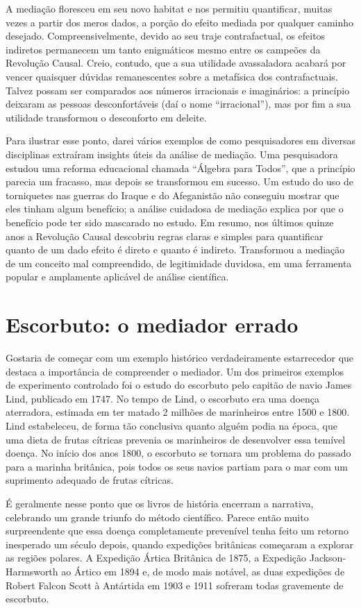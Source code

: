 \documentclass[11pt,a5paper,twoside]{book}
\begin{document}
A mediação floresceu em seu novo habitat e nos permitiu quantificar, muitas vezes a partir dos meros dados, a porção do efeito mediada por qualquer caminho desejado. Compreensivelmente, devido ao seu traje contrafactual, os efeitos indiretos permanecem um tanto enigmáticos mesmo entre os campeões da Revolução Causal. Creio, contudo, que a sua utilidade avassaladora acabará por vencer quaisquer dúvidas remanescentes sobre a metafísica dos contrafactuais. Talvez possam ser comparados aos números irracionais e imaginários: a princípio deixaram as pessoas desconfortáveis (daí o nome “irracional”), mas por fim a sua utilidade transformou o desconforto em deleite.

Para ilustrar esse ponto, darei vários exemplos de como pesquisadores em diversas disciplinas extraíram insights úteis da análise de mediação. Uma pesquisadora estudou uma reforma educacional chamada “Álgebra para Todos”, que a princípio parecia um fracasso, mas depois se transformou em sucesso. Um estudo do uso de torniquetes nas guerras do Iraque e do Afeganistão não conseguiu mostrar que eles tinham algum benefício; a análise cuidadosa de mediação explica por que o benefício pode ter sido mascarado no estudo. Em resumo, nos últimos quinze anos a Revolução Causal descobriu regras claras e simples para quantificar quanto de um dado efeito é direto e quanto é indireto. Transformou a mediação de um conceito mal compreendido, de legitimidade duvidosa, em uma ferramenta popular e amplamente aplicável de análise científica.

\section{Escorbuto: o mediador errado}
Gostaria de começar com um exemplo histórico verdadeiramente estarrecedor que destaca a importância de compreender o mediador. Um dos primeiros exemplos de experimento controlado foi o estudo do escorbuto pelo capitão de navio James Lind, publicado em 1747. No tempo de Lind, o escorbuto era uma doença aterradora, estimada em ter matado 2 milhões de marinheiros entre 1500 e 1800. Lind estabeleceu, de forma tão conclusiva quanto alguém podia na época, que uma dieta de frutas cítricas prevenia os marinheiros de desenvolver essa temível doença. No início dos anos 1800, o escorbuto se tornara um problema do passado para a marinha britânica, pois todos os seus navios partiam para o mar com um suprimento adequado de frutas cítricas.

É geralmente nesse ponto que os livros de história encerram a narrativa, celebrando um grande triunfo do método científico. Parece então muito surpreendente que essa doença completamente prevenível tenha feito um retorno inesperado um século depois, quando expedições britânicas começaram a explorar as regiões polares. A Expedição Ártica Britânica de 1875, a Expedição Jackson-Harmsworth ao Ártico em 1894 e, de modo mais notável, as duas expedições de Robert Falcon Scott à Antártida em 1903 e 1911 sofreram todas gravemente de escorbuto.
\end{document}
